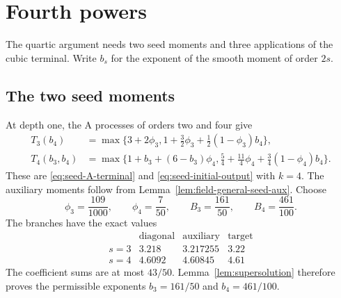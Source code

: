 \documentclass[11pt]{amsart}
\theoremstyle{definition}
\numberwithin{equation}{section}
\begin{document}
\section{Fourth powers}
\label{sec:fourth-powers}\label{sec:q12-analytic}
The quartic argument needs two seed moments and three applications
of the cubic terminal. Write $b_s$ for the exponent of the smooth
moment of order $2s$.

\subsection{The two seed moments}
At depth one, the A processes of orders two and four give
\begin{align}
 T_3(b_4)&=\max\{3+2\phi_3,
      1+\tfrac32\phi_3+\tfrac12(1-\phi_3)b_4\},
      \label{eq:q12-T3}\\
 T_4(b_3,b_4)&=\max\{1+b_3+(6-b_3)\phi_4,
      \tfrac54+\tfrac{11}{4}\phi_4+
                        \tfrac34(1-\phi_4)b_4\}.
      \label{eq:q12-T4}
\end{align}
These are \eqref{eq:seed-A-terminal} and
\eqref{eq:seed-initial-output} with $k=4$. The auxiliary moments
follow from Lemma~\ref{lem:field-general-seed-aux}.
Choose
\[
 \phi_3=\frac{109}{1000},\qquad\phi_4=\frac7{50},\qquad
 B_3=\frac{161}{50},\qquad B_4=\frac{461}{100}.
\]
The branches have the exact values
\[
\begin{array}{c|cc|c}
 &\text{diagonal}&\text{auxiliary}&\text{target}\\\hline
 s=3&3.218&3.217255&3.22\\
 s=4&4.6092&4.60845&4.61
\end{array}
\]
The coefficient sums are at most $43/50$.
Lemma~\ref{lem:supersolution} therefore proves the permissible
exponents $b_3=161/50$ and $b_4=461/100$.
\end{document}
